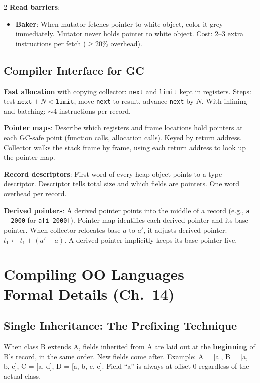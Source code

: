 \documentclass[9pt,landscape]{extarticle}
\begin{document}
\begin{multicols}{2}
\textbf{Read barriers}:
\begin{itemize}
  \item \textbf{Baker}: When mutator fetches pointer to white object, color it grey immediately. Mutator never holds pointer to white object. Cost: 2--3 extra instructions per fetch ($\geq 20\%$ overhead).
\end{itemize}

\subsection{Compiler Interface for GC}

\textbf{Fast allocation} with copying collector: \texttt{next} and \texttt{limit} kept in registers. Steps: test $\texttt{next} + N < \texttt{limit}$, move \texttt{next} to result, advance \texttt{next} by $N$. With inlining and batching: $\sim$4 instructions per record.

\textbf{Pointer maps}: Describe which registers and frame locations hold pointers at each GC-safe point (function calls, allocation calls). Keyed by return address. Collector walks the stack frame by frame, using each return address to look up the pointer map.

\textbf{Record descriptors}: First word of every heap object points to a type descriptor. Descriptor tells total size and which fields are pointers. One word overhead per record.

\textbf{Derived pointers}: A derived pointer points into the middle of a record (e.g., \texttt{a - 2000} for \texttt{a[i-2000]}). Pointer map identifies each derived pointer and its base pointer. When collector relocates base $a$ to $a'$, it adjusts derived pointer: $t_1 \leftarrow t_1 + (a' - a)$. A derived pointer implicitly keeps its base pointer live.

\section{Compiling OO Languages --- Formal Details (Ch.~14)}

\subsection{Single Inheritance: The Prefixing Technique}

When class B extends A, fields inherited from A are laid out at the \textbf{beginning} of B's record, in the same order. New fields come after. Example: A = [a], B = [a, b, c], C = [a, d], D = [a, b, c, e]. Field ``a'' is always at offset 0 regardless of the actual class.


\end{multicols}
\end{document}
